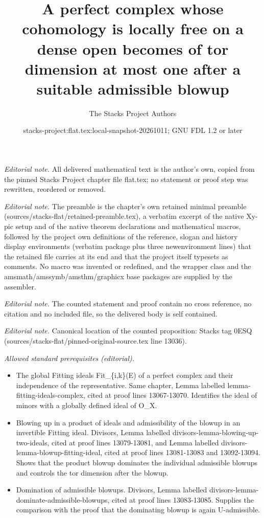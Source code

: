 \documentclass[10pt,a4paper]{amsart}
\title{A perfect complex whose cohomology is locally free on a dense open becomes of tor dimension at most one after a suitable admissible blowup}
\author{The Stacks Project Authors}
\date{stacks-project:flat.tex:local-snapshot-20261011; GNU FDL 1.2 or later}
\theoremstyle{plain}
\theoremstyle{definition}
\theoremstyle{remark}
\numberwithin{equation}{subsection}
\begin{document}
\maketitle
\noindent\textit{Editorial note.} All delivered mathematical text is the author's own, copied from the pinned Stacks Project chapter file flat.tex; no statement or proof step was rewritten, reordered or removed.\par\medskip
\noindent\textit{Editorial note.} The preamble is the chapter's own retained minimal preamble (sources/stacks-flat/retained-preamble.tex), a verbatim excerpt of the native Xy-pic setup and of the native theorem declarations and mathematical macros, followed by the project own definitions of the reference, slogan and history display environments (verbatim package plus three newenvironment lines) that the retained file carries at its end and that the project itself typesets as comments. No macro was invented or redefined, and the wrapper class and the amsmath/amssymb/amsthm/graphicx base packages are supplied by the assembler.\par\medskip
\noindent\textit{Editorial note.} The counted statement and proof contain no cross reference, no citation and no included file, so the delivered body is self contained.\par\medskip
\noindent\textit{Editorial note.} Canonical location of the counted proposition: Stacks tag 0ESQ (sources/stacks-flat/pinned-original-source.tex line 13036).\par\medskip
\noindent\textit{Allowed standard prerequisites (editorial).}\begin{itemize}
\item The global Fitting ideals Fit\_\{i,k\}(E) of a perfect complex and their independence of the representative. Same chapter, Lemma labelled lemma-fitting-ideals-complex, cited at proof lines 13067-13070. Identifies the ideal of minors with a globally defined ideal of O\_X.
\item Blowing up in a product of ideals and admissibility of the blowup in an invertible Fitting ideal. Divisors, Lemma labelled divisors-lemma-blowing-up-two-ideals, cited at proof lines 13079-13081, and Lemma labelled divisors-lemma-blowup-fitting-ideal, cited at proof lines 13081-13083 and 13092-13094. Shows that the product blowup dominates the individual admissible blowups and controls the tor dimension after the blowup.
\item Domination of admissible blowups. Divisors, Lemma labelled divisors-lemma-dominate-admissible-blowups, cited at proof lines 13083-13085. Supplies the comparison with the proof that the dominating blowup is again U-admissible.
\end{itemize}\medskip
\end{document}
